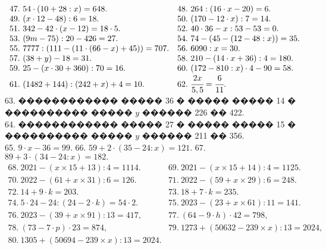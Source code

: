 \documentclass[12pt]{article}
\begin{document}
$\begin{array}{ll}
47.\ 54\cdot(10+28:x)=648.&
48.\ 264:(16\cdot x-20)=6.\\
49.\ (x\cdot12-48):6=18.&
50.\ (170-12\cdot x):7=14.\\
51.\ 342-42\cdot(x-12)=18\cdot5.&
52.\ 40\cdot36-x:53-53=0.\\
53.\ (9m-75):20-426=27.&
54.\ 74-(45-(12-48:x))=35.\\
55.\ 7777:(111-(11\cdot(66-x)+45))=707.&
56.\ 6090:x=30.\\
57.\ (38+y)-18=31.&
58.\ 210-(14\cdot x+36):4=180.\\
59.\ 25-(x\cdot30+360):70=16.&
60.\ (172-810:x)\cdot4-90=58.\\
61.\ (1482+144):(242+x)+4=10.&
62.\ \cfrac{2x}{5,5}=\cfrac{6}{11}.
\end{array}$\\
63. ������������ ����� 36 � ����� ����� 14 � ���������� ����� $y$ ������ 226 �� 422.\\
64. ������������ ����� 27 � ����� ����� 15 � ���������� ����� $y$ ������ 211 �� 356.\\
65. $9\cdot x -36=99.$ 66. $59+2\cdot(35-24:x)=121.$ 67. $89+3\cdot(34-24:x)=182.$\\
$\begin{array}{ll}
68.\ 2021-(x\times15+13):4=1114.& 69.\ 2021-(x\times15+14):4=1125.\\
70.\ 2022-(61+x\times31):6=126.& 71.\ 2022-(59+x\times29):6=248.\\
72.\ 14+9\cdot k=203.& 73.\ 18+7\cdot k=235.\\
74.\ 5\cdot24-24:(24-2\cdot k)=54\cdot2.&
75.\ 2023 - (23 + x \times 61) : 11 = 141.\\
76.\ 2023 - (39 + x \times 91) : 13 = 417,&
77.\ (64 - 9 \cdot h) \cdot 42 = 798,\\
78.\ (73 - 7 \cdot p) \cdot 23 = 874,&
79.\ 1273+(50632-239\times x):13=2024,\\
80.\ 1305+(50694-239\times x):13=2024.
\end{array}$
\newpage
\end{document}
